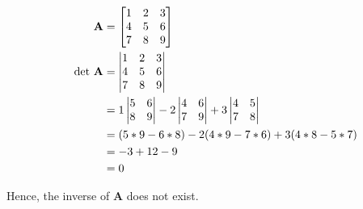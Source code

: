 \documentclass{article}
\begin{document}
\begin{align}
    \label{eq:1}
    && \textbf{A} &= \begin{bmatrix}
    1 & 2 & 3\\
    4 & 5 & 6\\
    7 & 8 & 9
    \end{bmatrix}
    \\
    \label{eq:2}
    && \text{det \textbf{A}} &= \begin{vmatrix}
    1 & 2 & 3\\
    4 & 5 & 6\\
    7 & 8 & 9
    \end{vmatrix}
    \\
    \label{eq:3}
    && &= 1\begin{vmatrix}
    5 & 6\\ 8 & 9
    \end{vmatrix} -2 \begin{vmatrix}
    4 & 6\\ 7 & 9
    \end{vmatrix} + 3\begin{vmatrix}
    4 & 5\\7&8\end{vmatrix}
    \\
    \label{eq:4}
    && &= (5*9-6*8)-2(4*9-7*6)+3(4*8-5*7)
    \\
    \label{eq:5}
    && &= -3 +12 -9
    \\
    \label{eq:6}
    && &= 0
\end{align}

Hence, the inverse of \textbf{A} does not exist.
\end{document}
